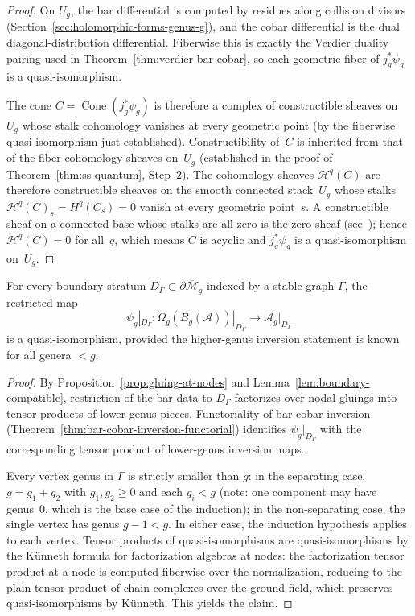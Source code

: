 \begin{proof}
On $U_g$, the bar differential is computed by residues along collision divisors
(Section~\ref{sec:holomorphic-forms-genus-g}), and the cobar differential is the
dual diagonal-distribution differential. Fiberwise this is exactly the Verdier
duality pairing used in Theorem~\ref{thm:verdier-bar-cobar}, so each geometric
fiber of $j_g^*\psi_g$ is a quasi-isomorphism.

The cone $C = \operatorname{Cone}(j_g^*\psi_g)$ is therefore a complex of
constructible sheaves on~$U_g$ whose stalk cohomology vanishes at every
geometric point (by the fiberwise quasi-isomorphism just established).
Constructibility of~$C$ is inherited from that of the fiber
cohomology sheaves on~$U_g$
(established in the proof of Theorem~\ref{thm:ss-quantum},
Step~2).
The cohomology sheaves $\mathcal{H}^q(C)$ are therefore
constructible sheaves on the smooth connected stack~$U_g$
whose stalks $\mathcal{H}^q(C)_s = H^q(C_s) = 0$ vanish at
every geometric point~$s$.
A constructible sheaf on a connected base whose stalks are all
zero is the zero sheaf
(see~\cite[Expos\'e~IX, Th\'eor\`eme~2.14]{SGA4});
hence $\mathcal{H}^q(C) = 0$ for all~$q$, which means $C$ is
acyclic and $j_g^*\psi_g$ is a quasi-isomorphism on~$U_g$.
\end{proof}

\begin{lemma}\label{lem:higher-genus-boundary-qi}
For every boundary stratum $D_\Gamma \subset \partial\overline{\mathcal{M}}_g$
indexed by a stable graph $\Gamma$, the restricted map
\[\psi_g|_{D_\Gamma}: \Omega_g(\bar{B}_g(\mathcal{A}))|_{D_\Gamma}
\longrightarrow \mathcal{A}_g|_{D_\Gamma}\]
is a quasi-isomorphism, provided the higher-genus inversion statement is known for
all genera $< g$.
\end{lemma}

\begin{proof}
By Proposition~\ref{prop:gluing-at-nodes} and
Lemma~\ref{lem:boundary-compatible}, restriction of the bar data to $D_\Gamma$
factorizes over nodal gluings into tensor products of lower-genus pieces.
Functoriality of bar-cobar inversion
(Theorem~\ref{thm:bar-cobar-inversion-functorial}) identifies
$\psi_g|_{D_\Gamma}$ with the corresponding tensor product of lower-genus inversion maps.

Every vertex genus in $\Gamma$ is strictly smaller than $g$: in the separating case,
$g=g_1+g_2$ with $g_1,g_2 \geq 0$ and each $g_i < g$ (note: one component may have genus~$0$, which is the base case of the induction); in the non-separating case, the single vertex has genus $g-1 < g$.  In either case, the induction hypothesis applies to each vertex. Tensor products of quasi-isomorphisms
are quasi-isomorphisms by the K\"unneth formula for factorization
algebras at nodes: the factorization tensor product at a node is
computed fiberwise over the normalization, reducing to the plain
tensor product of chain complexes over the ground field, which
preserves quasi-isomorphisms by K\"unneth.  This yields the claim.
\end{proof}

